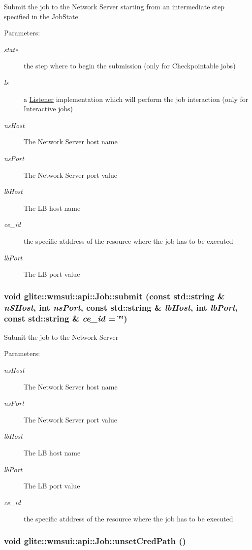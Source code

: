 Submit the job to the Network Server starting from an intermediate step specified in the Job\-State \begin{Desc}
\item[Parameters:]
\begin{description}
\item[{\em state}]the step where to begin the submission (only for Checkpointable jobs) \item[{\em ls}]a \hyperlink{classglite_1_1wmsui_1_1api_1_1Listener}{Listener} implementation which will perform the job interaction (only for Interactive jobs) \item[{\em ns\-Host}]The Network Server host name \item[{\em ns\-Port}]The Network Server port value \item[{\em lb\-Host}]The LB host name \item[{\em ce\_\-id}]the specific atddress of the resource where the job has to be executed \item[{\em lb\-Port}]The LB port value \end{description}
\end{Desc}
\hypertarget{classglite_1_1wmsui_1_1api_1_1Job_z23_0}{
\subsubsection[submit]{\setlength{\rightskip}{0pt plus 5cm}void glite::wmsui::api::Job::submit (const std::string \& {\em n\-SHost}, int {\em ns\-Port}, const std::string \& {\em lb\-Host}, int {\em lb\-Port}, const std::string \& {\em ce\_\-id} = \char`\"{}\char`\"{})}}
\label{classglite_1_1wmsui_1_1api_1_1Job_z23_0}


Submit the job to the Network Server \begin{Desc}
\item[Parameters:]
\begin{description}
\item[{\em ns\-Host}]The Network Server host name \item[{\em ns\-Port}]The Network Server port value \item[{\em lb\-Host}]The LB host name \item[{\em lb\-Port}]The LB port value \item[{\em ce\_\-id}]the specific atddress of the resource where the job has to be executed \end{description}
\end{Desc}
\hypertarget{classglite_1_1wmsui_1_1api_1_1Job_z17_3}{
\subsubsection[unsetCredPath]{\setlength{\rightskip}{0pt plus 5cm}void glite::wmsui::api::Job::unset\-Cred\-Path ()}}
\label{classglite_1_1wmsui_1_1api_1_1Job_z17_3}


